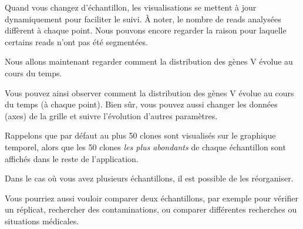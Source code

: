 \documentclass[10pt]{article}
\begin{document}
{Quand vous changez d'échantillon, les visualisations se mettent à jour
dynamiquement pour faciliter le suivi. À noter, le nombre de reads
analysées diffèrent à chaque point. Nous pouvons encore
regarder la raison pour laquelle certains reads n'ont pas été segmentées.

\bigskip

Nous allons maintenant regarder comment la distribution des gènes V évolue
au cours du temps.


Vous pouvez ainsi observer comment la distribution des gènes V
évolue au cours du temps (à chaque point). Bien sûr, vous pouvez aussi
changer les données (axes) de la grille et suivre l'évolution
d'autres paramètres.

\bigskip

Rappelons que par défaut au plus 50 clones sont visualisés sur le graphique
temporel, alors que les 50 clones \textit{les plus abondants} de chaque échantillon
sont affichés dans le reste de l'application.


\bigskip

Dans le cas où vous avez plusieurs échantillons, il est possible de les
réorganiser.


\bigskip

Vous pourriez aussi vouloir comparer deux échantillons, par exemple pour vérifier
un réplicat, rechercher des contaminations, ou comparer
différentes recherches ou situations médicales.


}
\end{document}
